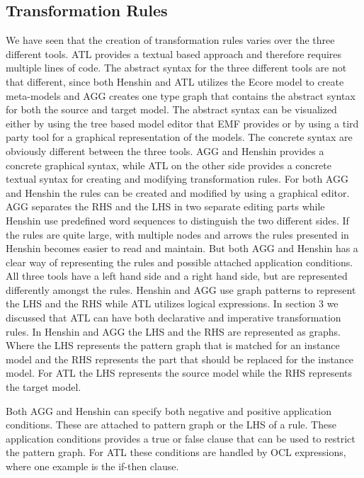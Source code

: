 \subsection{Transformation Rules}
We have seen that the creation of transformation rules varies over the three
different tools. ATL provides a textual based approach and therefore requires
multiple lines of code. The abstract syntax for the three different tools are
not that different, since both Henshin and ATL utilizes the Ecore model to
create meta-models and AGG creates one type graph that contains the abstract
syntax for both the source and target model. The abstract syntax can be
visualized either by using the tree based model editor that EMF provides or by
using a tird party tool for a graphical representation of the models. The
concrete syntax are obviously different between the three tools. AGG and Henshin
provides a concrete graphical syntax, while ATL on the other side provides a
concrete textual syntax for creating and modifying transformation rules. For
both AGG and Henshin the rules can be created and modified by using a graphical
editor. AGG separates the RHS and the LHS in two separate editing parts while
Henshin use predefined word sequences to distinguish the two different sides.
If the rules are quite large, with multiple nodes and arrows the rules
presented in Henshin becomes easier to read and maintain. But both AGG and
Henshin has a clear way of representing the rules and possible attached
application conditions. All three tools have a left hand side
and a right hand side, but are represented differently amongst the rules.
Henshin and AGG use graph patterns to represent the LHS and the RHS while ATL
utilizes logical expressions. In section 3 we discussed that ATL can have both
declarative and imperative transformation rules. In Henshin and AGG the LHS and
the RHS are represented as graphs. Where the LHS represents the pattern graph
that is matched for an instance model and the RHS represents the part that should be
replaced for the instance model. For ATL the LHS represents the source model
while the RHS represents the target model. 

Both AGG and Henshin can specify both negative and positive application
conditions. These are attached to pattern graph or the LHS of a rule. These
application conditions provides a true or false clause that can be used to
restrict the pattern graph. For ATL these conditions are handled by OCL
expressions, where one example is the if-then clause.

